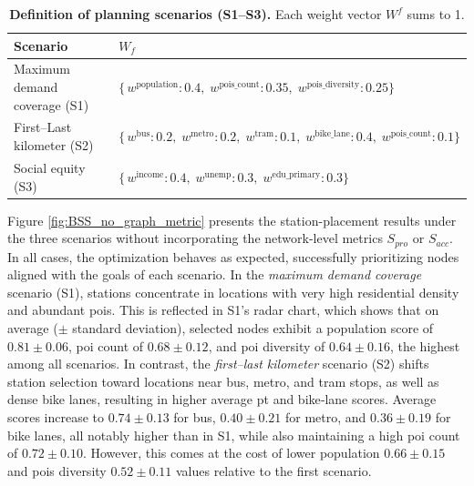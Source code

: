     \begin{table}[!htpb]
        \caption[Definition of planning scenarios (S1–S3)]{
            \textbf{Definition of planning scenarios (S1–S3).} 
            Each weight vector $W^f$ sums to 1.
        }
        \label{tab:scenario-defs}
        \footnotesize
        \centering
        \begin{tabular}{p{0.32\linewidth} p{0.68\linewidth}}
        \toprule
        \textbf{Scenario}  &  \textbf{$W_f$}\\
        \midrule
        Maximum demand coverage (S1)& \(\{\,w^{\mathrm{population}}:0.4,\;w^{\mathrm{pois\_count}}:0.35,\;w^{\mathrm{pois\_diversity}}:0.25\}\)\\
            First–Last kilometer (S2)& \(\{\,w^{\mathrm{bus}}:0.2,\;w^{\mathrm{metro}}:0.2,\;w^{\mathrm{tram}}:0.1,\;w^{\mathrm{bike\_lane}}:0.4,\;w^{\mathrm{pois\_count}}:0.1\}\)\\
            Social equity (S3)& \(\{\,w^{\mathrm{income}}:0.4,\;w^{\mathrm{unemp}}:0.3,\;w^{\mathrm{edu\_primary}}:0.3\}\)\\
        \bottomrule
        \end{tabular}
    \end{table}

    Figure \ref{fig:BSS_no_graph_metric} presents the station-placement results under the three scenarios without incorporating the network-level metrics $S_{pro}$ or $S_{acc}$. In all cases, the optimization behaves as expected, successfully prioritizing nodes aligned with the goals of each scenario. In the \textit{maximum demand coverage} scenario (S1), stations concentrate in locations with very high residential density and abundant \acp{poi}. This is reflected in S1's radar chart, which shows that on average ($\pm$ standard deviation), selected nodes exhibit a population score of $0.81 \pm 0.06$, \ac{poi} count of $0.68 \pm 0.12$, and \ac{poi} diversity of $0.64 \pm 0.16$, the highest among all scenarios. In contrast, the \textit{first–last kilometer} scenario (S2) shifts station selection toward locations near bus, metro, and tram stops, as well as dense bike lanes, resulting in higher average \ac{pt} and bike‐lane scores. Average scores increase to $0.74 \pm 0.13$ for bus, $0.40 \pm 0.21$ for metro, and $0.36 \pm 0.19$ for bike lanes, all notably higher than in S1, while also maintaining a high \ac{poi} count of $0.72 \pm 0.10$. However, this comes at the cost of lower population $0.66 \pm 0.15$ and \acp{poi} diversity $0.52 \pm 0.11$ values relative to the first scenario. 

